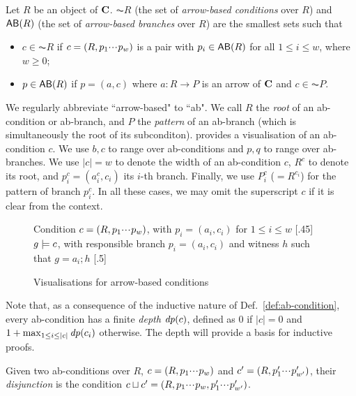 \begin{definition}\label{def:ab-condition}
  Let $R$ be an object of $\mathbf{C}$. $\AC R$ (the set of \emph{arrow-based conditions} over $R$) and $\AB R$ (the set of \emph{arrow-based branches} over $R$) are the smallest sets such that
  \begin{itemize}[defsep]
  \item $c\in \AC R$ if $c=(R,p_1{\cdotp\mkern-2mu\cdotp\mkern-2mu\cdotp\mkern1mu} p_w)$ is a pair with $p_i\in \AB R$ for all $1\leq i\leq w$, where $w \geq 0$;
  \item $p\in \AB R$ if $p=(a,c)$ where $a: R\to P$ is an arrow of $\mathbf{C}$ and $c\in \AC P$.
  \end{itemize}
\end{definition}
%
We regularly abbreviate ``arrow-based" to ``ab". We call $R$ the \emph{root} of an ab-condition or ab-branch, and $P$ the \emph{pattern} of an ab-branch (which is simultaneously the root of its subconditon).  provides a visualisation of an ab-condition $c$. We use $b,c$ to range over ab-conditions and $p,q$ to range over ab-branches. We use $|c|=w$ to denote the width of an ab-condition $c$, $R^c$ to denote its root, and $p^c_i=(a^c_i,c_i)$ its $i$-th branch. Finally, we use $P^c_i$ ($=R^{c_i}$) for the pattern of branch $p^c_i$. In all these cases, we may omit the superscript $c$ if it is clear from the context.
%
\begin{figure}[t]
\centering
\subcaptionbox
  {Condition $c=(R,p_1{\cdotp\mkern-2mu\cdotp\mkern-2mu\cdotp\mkern1mu} p_w)$, with $p_i=(a_i,c_i)$ for $1\leq i\leq w$
   }
  [.45\textwidth]
  {}
\quad
\subcaptionbox
  {$g\models c$, with responsible branch $p_i=(a_i,c_i)$ and witness $h$ such that $g=a_i;h$
   }
  [.5\textwidth]
  {}
\caption{Visualisations for arrow-based conditions}
\end{figure}

Note that, as a consequence of the inductive nature of Def.~\ref{def:ab-condition}, every ab-condition has a finite \emph{depth} $\mathit{dp}(c)$, defined as $0$ if $|c|=0$ and $1+\max_{1\leq i\leq |c|} \mathit{dp}(c_i)$ otherwise. The depth will provide a basis for inductive proofs.

Given two ab-conditions over $R$, $c=(R,p_1{\cdotp\mkern-2mu\cdotp\mkern-2mu\cdotp\mkern1mu} p_w)$ and $c'=(R,p'_1{\cdotp\mkern-2mu\cdotp\mkern-2mu\cdotp\mkern1mu} p'_{w'})$, their \emph{disjunction} is the condition ${c} \sqcup {c'} = (R,p_1{\cdotp\mkern-2mu\cdotp\mkern-2mu\cdotp\mkern1mu} p_w, p'_1{\cdotp\mkern-2mu\cdotp\mkern-2mu\cdotp\mkern1mu} p'_{w'})$.

